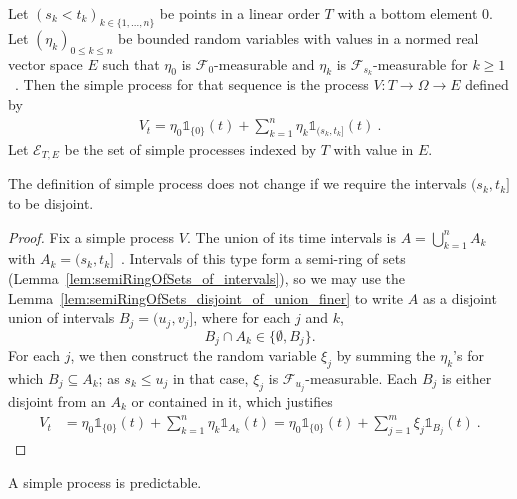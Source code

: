 \begin{definition}\label{def:simpleProcess}
  \leanok
Let $(s_k < t_k)_{k \in \{1, ..., n\}}$ be points in a linear order $T$ with a bottom element 0.
Let $(\eta_k)_{0 \le k \le n}$ be bounded random variables with values in a normed real vector space $E$ such that $\eta_0$ is $\mathcal{F}_0$-measurable and $\eta_k$ is $\mathcal{F}_{s_k}$-measurable for $k \ge 1$~.
Then the simple process for that sequence is the process $V : T \to \Omega \to E$ defined by
\begin{align*}
  V_t = \eta_0 \mathbb{1}_{\{0\}}(t) + \sum_{k=1}^{n} \eta_k \mathbb{1}_{(s_k, t_k]}(t)
  \: .
\end{align*}
Let $\mathcal{E}_{T, E}$ be the set of simple processes indexed by $T$ with value in $E$.
\end{definition}

\begin{lemma}\label{lem:simpleProcess_admitsDisjointIntervals}
  The definition of simple process does not change if we require the intervals $(s_k, t_k]$ to be disjoint.
\end{lemma}

\begin{proof}
  Fix a simple process $V$.
  The union of its time intervals is $A=\bigcup_{k=1}^n A_k$ with $A_k = (s_k, t_k]$~.
  Intervals of this type form a semi-ring of sets
  (Lemma~\ref{lem:semiRingOfSets_of_intervals}),
  so we may use the Lemma~\ref{lem:semiRingOfSets_disjoint_of_union_finer}
  to write $A$ as a disjoint union of intervals $B_j=(u_j, v_j]$,
  where for each $j$ and $k$,
  \[
  B_j \cap A_k \in \{\emptyset, B_j\}.
    \]
  For each $j$, we then construct the random variable $\xi_j$
  by summing the $\eta_k$'s for which $B_j \subseteq A_k$;
  as $s_k\le u_j$ in that case, $\xi_j$ is $\mathcal{F}_{u_j}$-measurable.
  Each $B_j$ is either disjoint from an $A_k$ or contained in it, which justifies
  \begin{align*}
    V_t
    &= \eta_0 \mathbb{1}_{\{0\}}(t) + \sum_{k=1}^{n} \eta_k \mathbb{1}_{A_k}(t)
    = \eta_0 \mathbb{1}_{\{0\}}(t) + \sum_{j=1}^{m} \xi_j \mathbb{1}_{B_j}(t)
    \: .
  \end{align*}
\end{proof}

\begin{lemma}\label{lem:predictable_simpleProcess}
  \leanok
A simple process is predictable.
\end{lemma}

